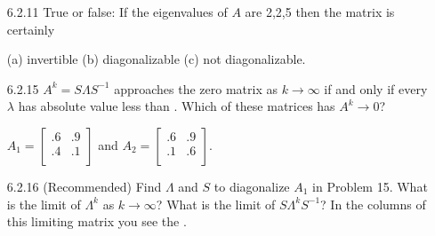 \documentclass[10pt,twoside,reqno]{article}
\begin{document}
\begin{enumerate}
\vspace{3mm}
\item[6.2.11] True or false: If the eigenvalues of $A$ are 2,2,5 then the matrix is certainly \\ 
\begin{center}
(a) invertible \hspace{10mm} (b) diagonalizable \hspace{10mm} (c) not diagonalizable. \\
\end{center}
\vspace{2mm}


\vspace{3mm}
\item[6.2.15] $A^k=S \Lambda S^{-1}$ approaches the zero matrix as $k \rightarrow \infty$ if and only if every $\lambda$ has absolute value less than \underline{\hspace{10mm}}. Which of these matrices has $A^k \rightarrow 0$? \\ 
\begin{center}
$
A_1=
\begin{bmatrix}
.6&.9\\
.4&.1\\
\end{bmatrix}
$
\hspace{8mm} and \hspace{8mm}
$
A_2=
\begin{bmatrix}
.6&.9\\
.1&.6\\
\end{bmatrix}
$. \\
\end{center}
\vspace{2mm}


\vspace{3mm}
\item[6.2.16] (Recommended) Find $\Lambda$ and $S$ to diagonalize $A_1$ in Problem 15. What is the limit of $\Lambda^k$ as $k \rightarrow \infty$? What is the limit of $S \Lambda^k S^{-1}$? In the columns of this limiting matrix you see the \underline{\hspace{10mm}}. \\ \vspace{2mm}



\end{enumerate}
\end{document}
